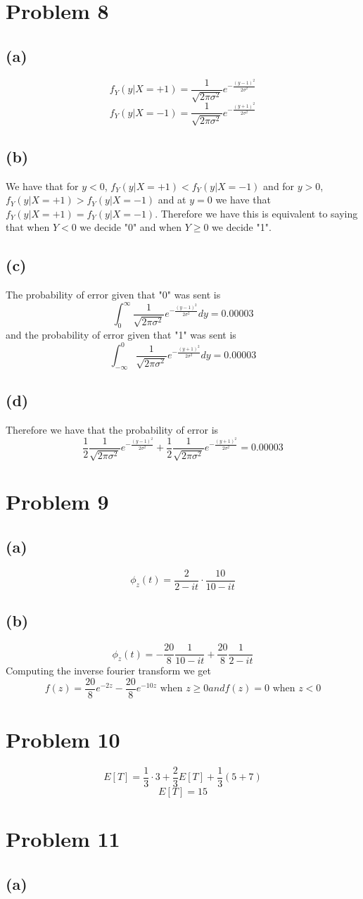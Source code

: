 \section*{Problem 8}
\subsection*{(a)}
$$f_Y(y|X=+1)=\frac{1}{\sqrt{2\pi\sigma^2}}e^{-\frac{(y-1)^2}{2\sigma^2}}$$
$$f_Y(y|X=-1)=\frac{1}{\sqrt{2\pi\sigma^2}}e^{-\frac{(y+1)^2}{2\sigma^2}}$$
\subsection*{(b)}
We have that for $y<0$, $f_Y(y|X=+1)<f_Y(y|X=-1)$ and for $y>0$, $f_Y(y|X=+1)>f_Y(y|X=-1)$
and at $y=0$ we have that $f_Y(y|X=+1)=f_Y(y|X=-1)$. Therefore we have this 
is equivalent to saying that when $Y<0$ we decide "0" and 
when $Y\geq0$ we decide "1".
\subsection*{(c)}
The probability of error given that "0" was sent is
$$\int_{0}^{\infty}\frac{1}{\sqrt{2\pi\sigma^2}}e^{-\frac{(y-1)^2}{2\sigma^2}}dy=0.00003$$
and the probability of error given that "1" was sent is
$$\int_{-\infty}^{0}\frac{1}{\sqrt{2\pi\sigma^2}}e^{-\frac{(y+1)^2}{2\sigma^2}}dy=0.00003$$
\subsection*{(d)}
Therefore we have that the probability of error is
$$\frac{1}{2}\frac{1}{\sqrt{2\pi\sigma^2}}e^{-\frac{(y-1)^2}{2\sigma^2}}+\frac{1}{2}\frac{1}{\sqrt{2\pi\sigma^2}}e^{-\frac{(y+1)^2}{2\sigma^2}}=0.00003$$
\section*{Problem 9}
\subsection*{(a)}
$$\phi_z(t)=\frac{2}{2-it}\cdot \frac{10}{10-it}$$
\subsection{(b)}
$$\phi_z(t)=-\frac{20}{8}\frac{1}{10-it}+\frac{20}{8}\frac{1}{2-it}$$
Computing the inverse fourier transform we get
$$f(z)=\frac{20}{8}e^{-2z}-\frac{20}{8}e^{-10z} \text{ when } z\geq 0 and f(z)=0 \text{ when } z<0$$
\section*{Problem 10}
$$E[T]=\frac{1}{3}\cdot 3+\frac{2}{3}E[T]+\frac{1}{3}(5+7)$$
$$E[T]=15$$
\section*{Problem 11}
\subsection*{(a)}







